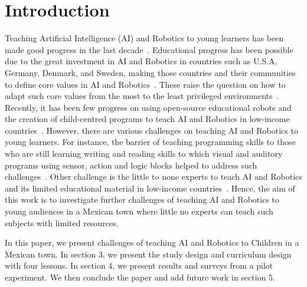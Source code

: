\documentclass[sigconf,anonymous,review]{acmart}
\begin{document}
\section{Introduction}
Teaching Artificial Intelligence (AI) and Robotics to young learners has been made good progress in the last decade~\cite{bers2019, druga2019}.
Educational progress has been possible due to the great investment in AI and Robotics in countries such as U.S.A, Germany, Denmark, and Sweden, making those countries and their communities to define core values in AI and Robotics~\cite{druga2019}. 
These raise the question on how to adapt such core values from the most to the least privileged environments~\cite{pratyusha2020}. 
Recently, it has been few progress on using open-source  educational robots and the creation of child-centred programs to teach AI and Robotics in low-income countries~\cite{abadilloperez2022_DEI_HRI2022, montenegro2021air4children}.
However, there are various challenges on teaching AI and Robotics to young learners.
For instance, the barrier of teaching programming skills to those who are still learning writing and reading skills to which visual and auditory programs using sensor, action and logic blocks helped to address such challenges~\cite{long2020, wyeth2008}.
Other challenge is the little to none experts to teach AI and Robotics and its limited educational material in low-income countries~\cite{yang2022, abadilloperez2022_DEI_HRI2022}.
Hence, the aim of this work is to investigate further challenges of teaching AI and Robotics to young audiences in a Mexican town where little no experts can teach such subjects with limited resources.

In this paper, we present challenges of teaching AI and Robotics to Children in a Mexican town.
In section 3, we present the study design and curriculum design with four lessons.
In section 4, we present results and surveys from a pilot experiment.
We then conclude the paper and add future work in section 5.

%
%
\end{document}
